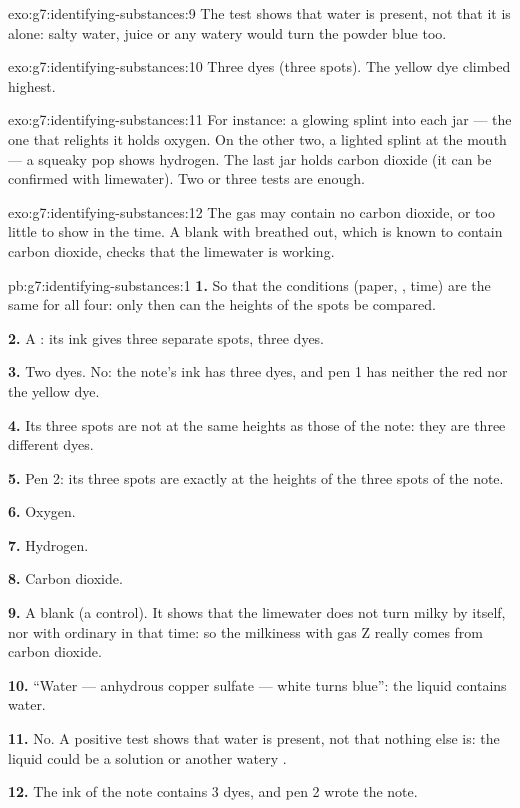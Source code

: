 \begin{solution}{exo:g7:identifying-substances:9}
The test shows that water is present, not that it is alone: salty water,
juice or any watery  would turn the powder blue too.
\end{solution}

\begin{solution}{exo:g7:identifying-substances:10}
Three dyes (three spots). The yellow dye climbed highest.
\end{solution}

\begin{solution}{exo:g7:identifying-substances:11}
For instance: a glowing splint into each jar --- the one that relights
it holds oxygen. On the other two, a lighted splint at the mouth --- a
squeaky pop shows hydrogen. The last jar holds carbon dioxide (it can be
confirmed with limewater). Two or three tests are enough.
\end{solution}

\begin{solution}{exo:g7:identifying-substances:12}
The gas may contain no carbon dioxide, or too little to show in the
time. A blank with  breathed out, which is known to contain carbon
dioxide, checks that the limewater is working.
\end{solution}

\begin{solution}{pb:g7:identifying-substances:1}
\textbf{1.} So that the conditions (paper, , time) are the same
for all four: only then can the heights of the spots be compared.

\textbf{2.} A : its ink gives three separate spots, three dyes.

\textbf{3.} Two dyes. No: the note's ink has three dyes, and pen 1 has
neither the red nor the yellow dye.

\textbf{4.} Its three spots are not at the same heights as those of the
note: they are three different dyes.

\textbf{5.} Pen 2: its three spots are exactly at the heights of the
three spots of the note.

\textbf{6.} Oxygen.

\textbf{7.} Hydrogen.

\textbf{8.} Carbon dioxide.

\textbf{9.} A blank (a control). It shows that the limewater does not
turn milky by itself, nor with ordinary  in that time: so the
milkiness with gas Z really comes from carbon dioxide.

\textbf{10.} ``Water --- anhydrous copper sulfate --- white turns blue'':
the liquid contains water.

\textbf{11.} No. A positive test shows that water is present, not that
nothing else is: the liquid could be a solution or another watery
.

\textbf{12.} The ink of the note contains 3 dyes, and pen 2 wrote the
note.
\end{solution}
